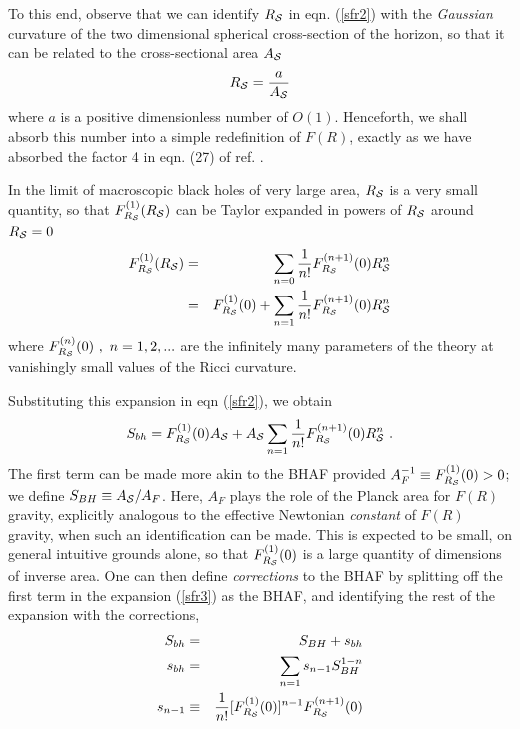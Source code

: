 \documentclass[11pt]{article}
\begin{document}
To this end, observe that we can identify $R_{\cal S}$ in eqn. (\ref{sfr2}) with the {\it Gaussian} curvature of the two dimensional spherical cross-section of the horizon, so that it can be related to the cross-sectional area $A_{\cal S}$
\begin{eqnarray}
R_{\cal S} = \frac{a}{A_{\cal S}} \label{gau}
\end{eqnarray}  
where $a$ is a positive dimensionless number of $O(1)$. Henceforth, we shall absorb this number into a simple redefinition of $F(R)$, exactly as we have absorbed the factor 4 in eqn. (27) of ref. \cite{far2010}. 

In the limit of macroscopic black holes of very large area,  $R_{\cal S}$ is a very small quantity, so that $F_{R_{\cal S}}^{(1)}(R_{\cal S})$ can be Taylor expanded in powers of $R_{\cal S}$ around $R_{\cal S}=0$
\begin{eqnarray}
F^{(1)}_{R_{\cal S}}(R_{\cal S}) &=& \sum_{n=0}\frac{1}{n!} F^{(n+1)}_{R_{\cal S}}(0) R_{\cal S}^n \nonumber \\
&=& F^{(1)}_{R_{\cal S}}(0) + \sum_{n=1}\frac{1}{n!} F^{(n+1)}_{R_{\cal S}}(0) R_{\cal S}^n \label{tay}
\end{eqnarray}
where $  F^{(n)}_{R_{\cal S}}(0)~,~ n=1,2,...$ are the infinitely many parameters of the theory at vanishingly small values of the Ricci curvature.     

Substituting this expansion in eqn (\ref{sfr2}), we obtain
\begin{eqnarray}
S_{bh} = F_{R_{\cal S}}^{(1)}(0) A_{\cal S} + A_{\cal S} \sum_{n=1}\frac{1}{n!} F^{(n+1)}_{R_{\cal S}}(0) R_{\cal S}^n ~. \label{sfr3}
\end{eqnarray}
The first term can be made more akin to the BHAF provided $A_F^{-1} \equiv F^{(1)}_{R_{\cal S}}(0) > 0$; we define $S_{BH} \equiv A_{\cal S}/A_F$. Here, $A_F$ plays the role of the Planck area for $F(R)$ gravity, explicitly analogous to the effective Newtonian {\it constant} of $F(R)$ gravity, when such an identification can be made. This is expected to be small, on general intuitive grounds alone, so that $F^{(1)}_{R_{\cal S}}(0)$ is a large quantity of dimensions of inverse area. One can then define {\it corrections} to the BHAF by splitting off the first term in the expansion (\ref{sfr3}) as the BHAF, and identifying the rest of the expansion with the corrections,  
\begin{eqnarray}
S_{bh} &=& S_{BH} + s_{bh} \nonumber \\
s_{bh} &=& \sum_{n=1} s_{n-1} S_{BH}^{1-n} \nonumber \\
s_{n-1} & \equiv & \frac{1}{n!} [F_{R_{\cal S}}^{(1)}(0)]^{n-1}F_{R_{\cal S}}^{(n+1)}(0) \label{sfr4}
\end{eqnarray}  
\end{document}
